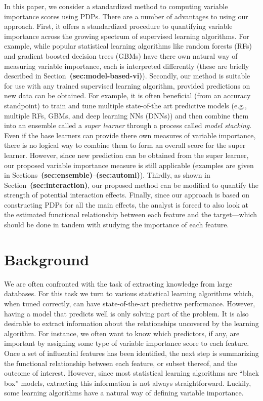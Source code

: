 \documentclass[12pt]{article}
\def\ref#1{\textbf{(#1)}}
\begin{document}
In this paper, we consider a standardized method to computing variable importance scores using PDPs. There are a number of advantages to using our approach. First, it offers a standardized procedure to quantifying variable importance across the growing spectrum of supervised learning algorithms. For example, while popular statistical learning algorithms like random forests (RFs) and gradient boosted decision trees (GBMs) have there own natural way of measuring variable importance, each is interpreted differently (these are briefly described in Section~\ref{sec:model-based-vi}). Secondly, our method is suitable for use with any trained supervised learning algorithm, provided predictions on new data can be obtained. For example, it is often beneficial (from an accuracy standpoint) to train and tune multiple state-of-the art predictive models (e.g., multiple RFs, GBMs, and deep learning NNs (DNNs)) and then combine them into an ensemble called a \textit{super learner} through a process called \textit{model stacking}. Even if the base learners can provide there own measures of variable importance, there is no logical way to combine them to form an overall score for the super learner. However, since new prediction can be obtained from the super learner, our proposed variable importance measure is still applicable (examples are given in Sections~\ref{sec:ensemble}--\ref{sec:automl}). Thirdly, as shown in Section~\ref{sec:interaction}, our proposed method can be modified to quantify the strength of potential interaction effects. Finally, since our approach is based on constructing PDPs for all the main effects, the analyst is forced to also look at the estimated functional relationship between each feature and the target---which should be done in tandem with studying the importance of each feature.


\section{Background}
\label{sec:background}

We are often confronted with the task of extracting knowledge from large databases. For this task we turn to various statistical learning algorithms which, when tuned correctly, can have state-of-the-art predictive performance. However, having a model that predicts well is only solving part of the problem. It is also desirable to extract information about the relationships uncovered by the learning algorithm. For instance, we often want to know which predictors, if any, are important by assigning some type of variable importance score to each feature. Once a set of influential features has been identified, the next step is summarizing the functional relationship between each feature, or subset thereof, and the outcome of interest. However, since most statistical learning algorithms are ``black box'' models, extracting this information is not always straightforward. Luckily, some learning algorithms have a natural way of defining variable importance.
\end{document}
